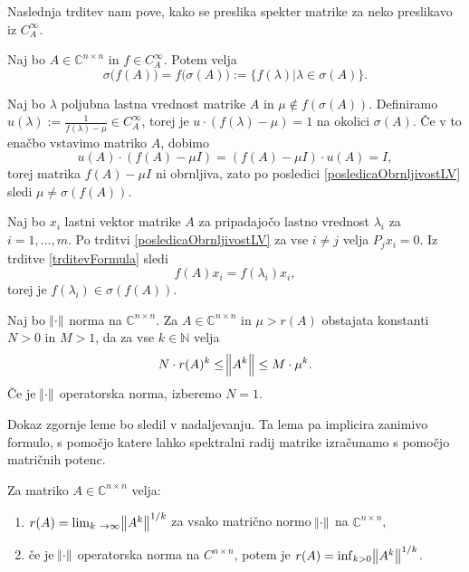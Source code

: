 \documentclass[mat1]{fmfdelo}
\newcommand{\N}{\mathbb N}
\newcommand{\C}{\mathbb C}
\begin{document}
Naslednja trditev nam pove, kako se preslika spekter matrike za neko preslikavo iz $C_A^\infty$.
\begin{izrek} \label{izrekOPreslikaviSpektra}
    Naj bo $A \in \C^{n \times n}$ in $f \in C_A^\infty$. Potem velja
    \begin{equation}
        \sigma\big(f(A)\big) = f\big(\sigma(A)\big) := \{f(\lambda) | \lambda \in \sigma(A)\}.
    \end{equation}
\end{izrek}
\begin{dokaz}
    Naj bo $\lambda$ poljubna lastna vrednost matrike $A$ in $\mu \notin f(\sigma(A))$. Definiramo $u(\lambda) := \frac{1}{f(\lambda) - \mu} \in C_A^\infty$, torej je $u \cdot (f(\lambda) - \mu) = 1$ na okolici $\sigma(A)$. Če v to enačbo vstavimo matriko $A$, dobimo
    \begin{equation}
        u(A) \cdot (f(A) - \mu I) = (f(A) - \mu I) \cdot u(A) = I,
    \end{equation}
    torej matrika $f(A) - \mu I$ ni obrnljiva, zato po posledici \ref{posledicaObrnljivostLV} sledi $\mu \neq \sigma(f(A))$.
    
    Naj bo $x_i$ lastni vektor matrike $A$ za pripadajočo lastno vrednost $\lambda_i$ za $i = 1, \ldots, m$. Po trditvi \ref{posledicaObrnljivostLV} za vse $i \neq j$ velja $P_j x_i = 0$. Iz trditve \ref{trditevFormula} sledi
    \begin{equation}
        f(A) x_i = f(\lambda_i) x_i,
    \end{equation}
    torej je $f(\lambda_i) \in \sigma(f(A))$.
\end{dokaz}

\begin{lema}\label{lemaNorme}
    Naj bo $\norm{\cdot}$ norma na $\C^{n \times n}$. Za $A \in \C^{n \times n}$ in $\mu > r(A)$ obstajata konstanti $N > 0$ in $M > 1$, da za vse $k \in \N$ velja
    \begin{equation}
        N \cdot r(A)^k \leq \norm{A^k} \leq M \cdot \mu^k.
    \end{equation}
    Če je $\norm{\cdot}$ operatorska norma, izberemo $N = 1$.
\end{lema}
Dokaz zgornje leme bo sledil v nadaljevanju. Ta lema pa implicira zanimivo formulo, s pomočjo katere lahko spektralni radij matrike izračunamo s pomočjo matričnih potenc.
\begin{trditev}  \label{gelfand}
    Za matriko $A \in \C^{n \times n}$ velja:
    \begin{enumerate}
        \item $r(A) = \lim_{k \rightarrow \infty} \norm{A^k}^{1/k}$ za vsako matrično normo $\norm{\cdot}$ na $\C^{n \times n}$,
        \item če je $\norm{\cdot}$ operatorska norma na $C^{n \times n}$, potem je $r(A) = \inf_{k > 0} \norm{A^k}^{1/k}$.
    \end{enumerate}
\end{trditev}
\end{document}
